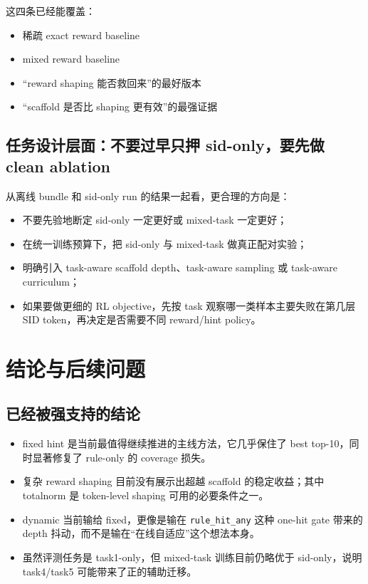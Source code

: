 \documentclass[a4paper]{article}
\begin{document}
这四条已经能覆盖：
\begin{itemize}
\item 稀疏 exact reward baseline
\item mixed reward baseline
\item “reward shaping 能否救回来”的最好版本
\item “scaffold 是否比 shaping 更有效”的最强证据
\end{itemize}

\subsection{任务设计层面：不要过早只押 sid-only，要先做 clean ablation}

从离线 bundle 和 sid-only run 的结果一起看，更合理的方向是：
\begin{itemize}
\item 不要先验地断定 sid-only 一定更好或 mixed-task 一定更好；
\item 在统一训练预算下，把 sid-only 与 mixed-task 做真正配对实验；
\item 明确引入 task-aware scaffold depth、task-aware sampling 或 task-aware curriculum；
\item 如果要做更细的 RL objective，先按 task 观察哪一类样本主要失败在第几层 SID token，再决定是否需要不同 reward/hint policy。
\end{itemize}

\section{结论与后续问题}

\subsection{已经被强支持的结论}

\begin{itemize}
\item fixed hint 是当前最值得继续推进的主线方法，它几乎保住了 best top-10，同时显著修复了 rule-only 的 coverage 损失。
\item 复杂 reward shaping 目前没有展示出超越 scaffold 的稳定收益；其中 totalnorm 是 token-level shaping 可用的必要条件之一。
\item dynamic 当前输给 fixed，更像是输在 \texttt{rule\_hit\_any} 这种 one-hit gate 带来的 depth 抖动，而不是输在“在线自适应”这个想法本身。
\item 虽然评测任务是 task1-only，但 mixed-task 训练目前仍略优于 sid-only，说明 task4/task5 可能带来了正的辅助迁移。
\end{itemize}
\end{document}
